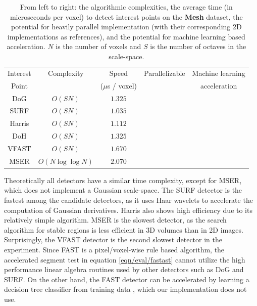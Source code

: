 \begin{table}
\centering
\begin{tabular}{c|cccc}
\hline
Interest 	& Complexity 	& Speed 			& Parallelizable & Machine learning \\
Point 		& 				& ($\mu$s / voxel) 	& 				 & acceleration 	\\ 	
\hline
DoG 		& $O(SN)$ 			& $1.325 $ 			& \checkmark \cite{Sinha2006} & \\
SURF 		& $O(SN)$ 			& $1.035 $ 			& \checkmark \cite{Cornelis2008} & \\
Harris 		& $O(SN)$ 			& $1.112 $ 			& \checkmark \cite{Teixeira2008} & \\
DoH			& $O(SN)$ 			& $1.325 $ 			& \checkmark \cite{Bhatia2007} \\
VFAST 		& $O(SN)$ 			& $1.670 $ 			& \checkmark \cite{Dohi2011} & \checkmark \cite{Rosten2010}\\
MSER 		& $O(N\log\log N)$ 	& $2.070 $ 			& \checkmark \cite{Kristensen2007} &\\
\hline
\end{tabular}
\caption{From left to right: the algorithmic complexities, the average time (in microseconds per voxel) to detect interest points on the \textbf{Mesh} dataset, the potential for heavily parallel implementation (with their corresponding 2D implementations as references), and the potential for machine learning based acceleration. $N$ is the number of voxels and $S$ is the number of octaves in the scale-space.}
\label{tab/eval/speedtable}
\end{table}

Theoretically all detectors have a similar time complexity, except for MSER, which does not implement a Gaussian scale-space. The SURF detector is the fastest among the candidate detectors, as it uses Haar wavelets to accelerate the computation of Gaussian derivatives. Harris also shows high efficiency due to its relatively simple algorithm. MSER is the slowest detector, as the search algorithm for stable regions is less efficient in 3D volumes than in 2D images. Surprisingly, the VFAST detector is the second slowest detector in the experiment. Since FAST is a pixel/voxel-wise rule based algorithm, the accelerated segment test in equation \ref{eqn/eval/fastast} cannot utilize the high performance linear algebra routines used by other detectors such as DoG and SURF. On the other hand, the FAST detector can be accelerated by learning a decision tree classifier from training data \cite{Rosten2010}, which our implementation does not use.


